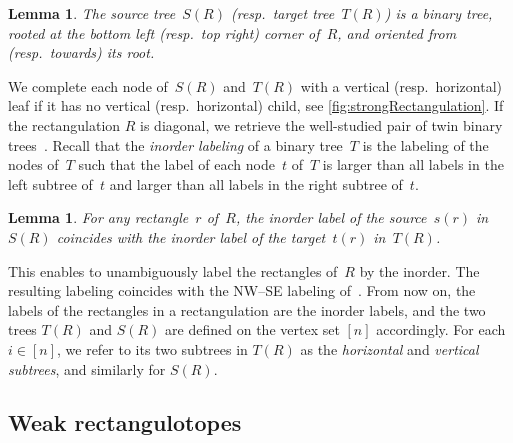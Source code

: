 \documentclass{amsart}
\newtheorem{lemma}[theorem]{Lemma}
\theoremstyle{definition}
\newcommand{\darkblue}{\color{darkblue}} %
\newcommand{\defn}[1]{\textsl{\darkblue #1}} %
\begin{document}
\begin{lemma}
The source tree~$S(R)$ (resp.~target tree~$T(R)$) is a binary tree, rooted at the bottom left (resp.~top right) corner of~$R$, and oriented from (resp.~towards) its root.
\end{lemma}

We complete each node of~$S(R)$ and~$T(R)$ with a vertical (resp.~horizontal) leaf if it has no vertical (resp.~horizontal) child, see \cref{fig:strongRectangulation}.
If the rectangulation $R$ is diagonal, we retrieve the well-studied pair of twin binary trees~\cite{MR1417289,MR2914637}.
Recall that the \defn{inorder labeling} of a binary tree~$T$ is the labeling of the nodes of~$T$ such that the label of each node~$t$ of~$T$ is larger than all labels in the left subtree of~$t$ and larger than all labels in the right subtree of~$t$.

\begin{lemma}
For any rectangle~$r$ of~$R$, the inorder label of the source~$s(r)$ in~$S(R)$ coincides with the inorder label of the target~$t(r)$ in~$T(R)$.
\end{lemma}

This enables to unambiguously label the rectangles of~$R$ by the inorder.
The resulting labeling coincides with the NW--SE labeling of~\cite{ACFF24}.
From now on, the labels of the rectangles in a rectangulation are the inorder labels, and the two trees $T(R)$ and $S(R)$ are defined on the vertex set $[n]$ accordingly.
For each $i\in [n]$, we refer to its two subtrees in $T(R)$ as the \defn{horizontal} and \defn{vertical subtrees}, and similarly for $S(R)$.


\subsection{Weak rectangulotopes}
\label{subsec:weakRectangulotopes}
\end{document}
